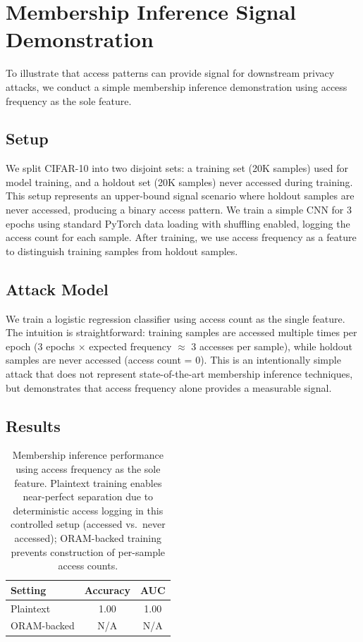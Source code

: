 \documentclass{llncs}
\begin{document}
\section{Membership Inference Signal Demonstration}
\label{sec:inference}

To illustrate that access patterns can provide signal for downstream privacy attacks, we conduct a simple membership inference demonstration using access frequency as the sole feature.

\subsection{Setup}

We split CIFAR-10 into two disjoint sets: a training set (20K samples) used for model training, and a holdout set (20K samples) never accessed during training.
This setup represents an upper-bound signal scenario where holdout samples are never accessed, producing a binary access pattern.
We train a simple CNN for 3 epochs using standard PyTorch data loading with shuffling enabled, logging the access count for each sample.
After training, we use access frequency as a feature to distinguish training samples from holdout samples.

\subsection{Attack Model}

We train a logistic regression classifier using access count as the single feature.
The intuition is straightforward: training samples are accessed multiple times per epoch (3 epochs $\times$ expected frequency $\approx$ 3 accesses per sample), while holdout samples are never accessed (access count = 0).
This is an intentionally simple attack that does not represent state-of-the-art membership inference techniques, but demonstrates that access frequency alone provides a measurable signal.

\subsection{Results}

\begin{table}[t]
\centering
\small
\caption{Membership inference performance using access frequency as the sole feature. Plaintext training enables near-perfect separation due to deterministic access logging in this controlled setup (accessed vs.\ never accessed); ORAM-backed training prevents construction of per-sample access counts.}
\label{tab:membership}
\begin{tabular}{lcc}
\toprule
\textbf{Setting} & \textbf{Accuracy} & \textbf{AUC} \\
\midrule
Plaintext & 1.00 & 1.00 \\
ORAM-backed & N/A & N/A \\
\bottomrule
\end{tabular}
\end{table}
\end{document}
